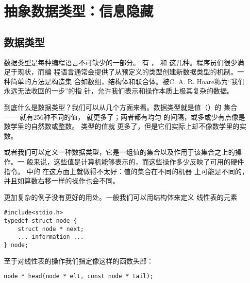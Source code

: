 

\chapter{抽象数据类型：信息隐藏}
\label{ch:AbstractDateTypes}

\section{数据类型}


数据类型是每种编程语言不可缺少的一部分。 有 ，
 和  这几种。程序员们很少满足于现状，而编
程语言通常会提供了从预定义的类型创建新数据类型的机制。一种简单的方法是构造集
合如数组，结构体和联合体。被C. A. R. Hoare称为“我们永远无法收回的一步”的指
针，允许我们表示和操作本质上极其复杂的数据。

到底什么是数据类型？我们可以从几个方面来看。数据类型就是值（）的
集合—— 就有256种不同的值， 就更多了；两者都有均匀
的间隔，或多或少有点像是数学里的自然数或整数。 类型的值就
更多了，但是它们实际上却不像数学里的实数。

或者我们可以定义一种数据类型，它是一组值的集合以及作用于该集合之上的操作。一
般来说，这些值是计算机能够表示的，而这些操作多少反映了可用的硬件指令。
 中的  在这方面上就做得不太好：值的集合在不同的机器
上可能是不同的，并且如算数右移一样的操作也会不同。

更加复杂的例子没有更好的用处。一般我们可以用结构体来定义
线性表的元素
\begin{lstlisting}
#include<stdio.h>
typedef struct node {
	struct node * next;
	... information ...
} node;
\end{lstlisting}
至于对线性表的操作我们指定像这样的函数头部：
\begin{lstlisting}
node * head(node * elt, const node * tail);
\end{lstlisting}

